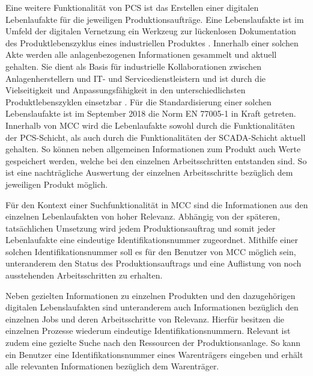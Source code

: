 
Eine weitere Funktionalität von PCS ist das Erstellen einer digitalen Lebenlaufakte für die jeweiligen Produktionsaufträge. Eine Lebenslaufakte ist im Umfeld der digitalen Vernetzung ein Werkzeug zur lückenlosen Dokumentation des Produktlebenszyklus eines industriellen Produktes \cite{MaximilianAusterjost.2021}. Innerhalb einer solchen Akte werden alle anlagenbezogenen Informationen gesammelt und aktuell gehalten. Sie dient als Basis für industrielle Kollaborationen zwischen Anlagenherstellern und IT- und Servicedienstleistern und ist durch die Vielseitigkeit und Anpassungsfähigkeit in den unterschiedlichsten Produktlebenszyklen einsetzbar \cite{MaximilianAusterjost.2021}. Für die Standardisierung einer solchen Lebenslaufakte ist im September 2018 die Norm \glqq EN 77005-1\grqq{} in Kraft getreten. Innerhalb von MCC wird die Lebenlaufakte sowohl durch die Funktionalitäten der PCS-Schicht, als auch durch die Funktionalitäten der SCADA-Schicht aktuell gehalten. So können neben allgemeinen Informationen zum Produkt auch Werte gespeichert werden, welche bei den einzelnen Arbeitsschritten entstanden sind. So ist eine nachträgliche Auswertung der einzelnen Arbeitsschritte bezüglich dem jeweiligen Produkt möglich.

Für den Kontext einer Suchfunktionalität in MCC sind die Informationen aus den einzelnen Lebenlaufakten von hoher Relevanz. Abhängig von der späteren, tatsächlichen Umsetzung wird jedem Produktionsauftrag und somit jeder Lebenlaufakte eine eindeutige Identifikationsnummer zugeordnet. Mithilfe einer solchen Identifikationsnummer soll es für den Benutzer von MCC möglich sein, unteranderem den Status des Produktionsauftrags und eine Auflistung von noch ausstehenden Arbeitsschritten zu erhalten.

Neben gezielten Informationen zu einzelnen Produkten und den dazugehörigen digitalen Lebenslaufakten sind unteranderem auch Informationen bezüglich den einzelnen Jobs und deren Arbeitsschritte von Relevanz. Hierfür besitzen die einzelnen Prozesse wiederum eindeutige Identifikationsnummern. Relevant ist zudem eine gezielte Suche nach den Ressourcen der Produktionsanlage. So kann ein Benutzer eine Identifikationsnummer eines Warenträgers eingeben und erhält alle relevanten Informationen bezüglich dem Warenträger.



